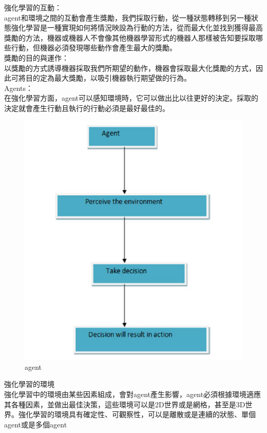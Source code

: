 \documentclass[14pt,a4paper]{report}  %
\begin{document}
\fi
強化學習的互動：\\[1pt]
 agent和環境之間的互動會產生獎勵，我們採取行動，從一種狀態轉移到另一種狀態強化學習是一種實現如何將情況映設為行動的方法，從而最大化並找到獲得最高獎勵的方法，機器或機器人不會像其他機器學習形式的機器人那樣被告知要採取哪些行動，但機器必須發現哪些動作會產生最大的獎勵。\\[1pt]
獎勵的目的與運作：\\
 以獎勵的方式誘導機器採取我們所期望的動作，機器會採取最大化獎勵的方式，因此可將目的定為最大獎勵，以吸引機器執行期望做的行為。\\[6pt]
Agents：\\[6pt]
 在強化學習方面，agent可以感知環境時，它可以做出比以往更好的決定。採取的決定就會產生行動且執行的行動必須是最好最佳的。\\[12pt]
\begin{figure}[hbt!]
\begin{center}
\includegraphics[scale=0.74]{agent}
\caption{\Large agent}
\label{agent}
\end{center}
\end{figure}
強化學習的環境\\
\qquad 強化學習中的環境由某些因素組成，會對agent產生影響，agent必須根據環境適應其各種因素，並做出最佳決策，這些環境可以是2D世界或是網格，甚至是3D世界。強化學習的環境具有確定性、可觀察性，可以是離散或是連續的狀態、單個agent或是多個agent\\
\end{document}
